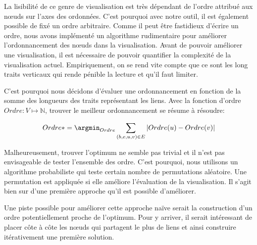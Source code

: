 La lisibilité de ce genre de visualisation est très dépendant de l'ordre attribué aux n\oe uds sur l'axes des ordonnées.
C'est pourquoi avec notre outil, il est également possible de fixé un ordre arbitraire.
Comme il peut être fastidieux d'écrire un ordre, nous avons implémenté un algorithme rudimentaire pour améliorer l'ordonnancement des n\oe uds dans la visualisation.
Avant de pouvoir améliorer une visualisation, il est nécessaire de pouvoir quantifier la complexité de la visualisation actuel.
Empiriquement, on se rend vite compte que ce sont les long traits verticaux qui rende pénible la lecture et qu'il faut limiter.

C'est pourquoi nous décidons d'évaluer une ordonnancement en fonction de la somme des longueurs des traits représentant les liens.
Avec la fonction d'ordre $Ordre: V \longmapsto \mathbb{N}$, trouver le meilleur ordonnancement se résume à résoudre:

\begin{equation}
 Ordre* = \argmin_{Ordre}  \sum_{(b,e,u,v) \in E} |Ordre(u)- Ordre(v)|
\end{equation}

Malheureusement, trouver l'optimum ne semble pas trivial et il n'est pas envisageable de tester l'ensemble des ordre.
C'est pourquoi, nous utilisons un algorithme probabiliste qui teste certain nombre de permutations aléatoire.
Une permutation est appliquée si elle améliore l'évaluation de la visualisation.
Il s'agit bien sur d'une première approche qu'il est possible d'améliorer.

Une piste possible pour améliorer cette approche naïve serait la construction d'un ordre potentiellement proche de l'optimum.
Pour y arriver, il serait intéressant de placer côte à côte les n\oe uds qui partagent le plus de liens et ainsi construire itérativement une première solution.